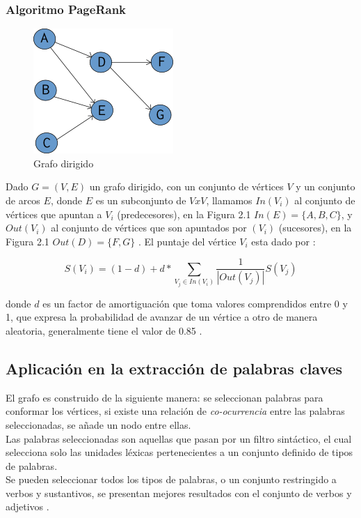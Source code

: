 \subsubsection{Algoritmo PageRank}
\begin{figure}
	\centering
		\includegraphics[]{recursos/img/grafoDirigido}
		\caption {Grafo dirigido}
\end{figure}

Dado $G=(V,E)$ un grafo dirigido, con un conjunto de v\'ertices $V$ y un conjunto
de arcos $E$, donde $E$ es un subconjunto de $V x V$, llamamos $In(V_i)$ al
conjunto de v\'ertices que apuntan a $V_i$ (predecesores),  en la Figura 2.1
$In(E)=\{A,B,C\}$, y $Out(V_i)$ al conjunto de v\'ertices que son apuntados por $(V_i)$
(sucesores), en la Figura 2.1 $Out(D)=\{F,G\}$ . El puntaje del v\'ertice $V_i$ 
esta dado por \cite{SBLP98}:

\begin{equation}
	S(V_i) = (1 - d) + d * \sum_{V_j\in In(V_i)}{\frac{1}{|Out(V_j)|}S(V_j)}
\end{equation}

donde $d$ es un factor de amortiguaci\'on que toma valores comprendidos entre
0 y 1, que expresa la probabilidad de avanzar de un v\'ertice a otro de manera
aleatoria, generalmente tiene el valor de 0.85 \cite{SBLP98}.

\subsection{Aplicaci\'on en la extracci\'on de palabras claves}
El grafo es construido de la siguiente manera: se seleccionan palabras  para 
conformar los v\'ertices, si existe una relaci\'on de \emph{co-ocurrencia} entre 
las palabras seleccionadas, se a\~nade un nodo entre ellas. \\

Las palabras seleccionadas son aquellas que pasan por un filtro sint\'actico, el cual
selecciona solo las unidades l\'exicas pertenecientes a un conjunto definido de tipos
de palabras. \\

Se pueden seleccionar todos los tipos de palabras, o un conjunto restringido a verbos
y sustantivos, se presentan mejores resultados con el conjunto de verbos y
adjetivos \cite{RMPT04} .
